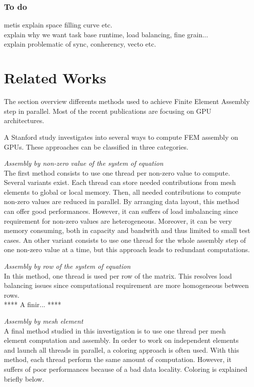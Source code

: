 \documentclass{IOS-Book-Article}
\begin{document}
\subsubsection{To do}
metis explain space filling curve etc.\\
explain why we want task base runtime, load balancing, fine grain...\\
explain problematic of sync, conherency, vecto etc.\\

\section{Related Works}
The section overview differents methods used to achieve Finite Element Assembly step in parallel.
Most of the recent publications are focusing on GPU architectures.

A Stanford study \cite{Stanford} investigates into several ways to compute FEM assembly on GPUs.
These approaches can be classified in three categories.

\emph{Assembly by non-zero value of the system of equation}\\
The first method consists to use one thread per non-zero value to compute. Several variants exist.
Each thread can store needed contributions from mesh elements to global or local memory. Then, all needed contributions to compute non-zero values are reduced in parallel.
By arranging data layout, this method can offer good performances. However, it can suffers of load imbalancing since requirement for non-zero values are heterogeneous.
Moreover, it can be very memory consuming, both in capacity and bandwith and thus limited to small test cases.
An other variant consists to use one thread for the whole assembly step of one non-zero value at a time, but this approach leads to redundant computations.

\emph{Assembly by row of the system of equation}\\
In this method, one thread is used per row of the matrix. This resolves load balancing issues since computational requirement are more homogeneous between rows.\\
**** A finir... ****

\emph{Assembly by mesh element}\\
A final method studied in this investigation is to use one thread per mesh element computation and assembly.
In order to work on independent elements and launch all threads in parallel, a coloring approach is often used.
With this method, each thread perform the same amount of computation. However, it suffers of poor performances because of a bad data locality.
Coloring is explained briefly below.
\end{document}

